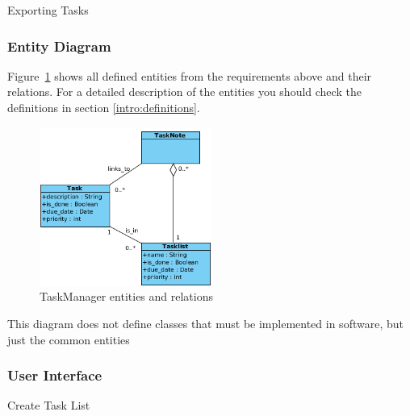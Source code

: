 \newpage

\begin{samepage}\begin{requirement}{Exporting Tasks}
  \label{requirements:functional:export}
\end{requirement}\end{samepage}


    \subsubsection{Entity Diagram}
    Figure~\ref{entities_relations} shows all defined entities from the requirements above and their relations.
    For a detailed description of the entities you should check the definitions in section \ref{intro:definitions}.
    \begin{figure}[ht]
	    \centering
        \includegraphics[width=0.5\textwidth]{graphics/entity_diagram.png}
        \caption{TaskManager entities and relations}
        \label{entities_relations}
    \end{figure}
    
    This diagram does not define classes that must be implemented in software, but just the common entities

\newpage

    \subsubsection{User Interface}
    \label{requirements:interfaces:user}

    \begin{samepage}\begin{requirement}{Create Task List}
    \label{requirements:interfaces:user:create_tasklist}
    \end{requirement}\end{samepage}

